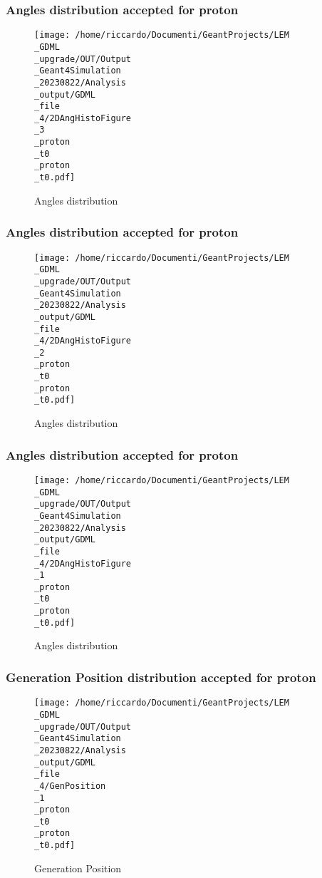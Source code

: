 \documentclass[8pt]{beamer}
\begin{document}
            \begin{frame}
                \frametitle{Angles distribution accepted for proton}
            
        \begin{figure}[h]
            \centering
            \texttt{[image: /home/riccardo/Documenti/GeantProjects/LEM\\\_GDML\\\_upgrade/OUT/Output\\\_Geant4Simulation\\\_20230822/Analysis\\\_output/GDML\\\_file\\\_4/2DAngHistoFigure\\\_3\\\_proton\\\_t0\\\_proton\\\_t0.pdf]}
            \caption{Angles distribution}
        \end{figure}
        
            \end{frame}
            
            \begin{frame}
                \frametitle{Angles distribution accepted for proton}
            
        \begin{figure}[h]
            \centering
            \texttt{[image: /home/riccardo/Documenti/GeantProjects/LEM\\\_GDML\\\_upgrade/OUT/Output\\\_Geant4Simulation\\\_20230822/Analysis\\\_output/GDML\\\_file\\\_4/2DAngHistoFigure\\\_2\\\_proton\\\_t0\\\_proton\\\_t0.pdf]}
            \caption{Angles distribution}
        \end{figure}
        
            \end{frame}
            
            \begin{frame}
                \frametitle{Angles distribution accepted for proton}
            
        \begin{figure}[h]
            \centering
            \texttt{[image: /home/riccardo/Documenti/GeantProjects/LEM\\\_GDML\\\_upgrade/OUT/Output\\\_Geant4Simulation\\\_20230822/Analysis\\\_output/GDML\\\_file\\\_4/2DAngHistoFigure\\\_1\\\_proton\\\_t0\\\_proton\\\_t0.pdf]}
            \caption{Angles distribution}
        \end{figure}
        
            \end{frame}
            
            \begin{frame}
                \frametitle{Generation Position distribution accepted for proton}
            
        \begin{figure}[h]
            \centering
            \texttt{[image: /home/riccardo/Documenti/GeantProjects/LEM\\\_GDML\\\_upgrade/OUT/Output\\\_Geant4Simulation\\\_20230822/Analysis\\\_output/GDML\\\_file\\\_4/GenPosition\\\_1\\\_proton\\\_t0\\\_proton\\\_t0.pdf]}
            \caption{Generation Position}
        \end{figure}
        
            \end{frame}
            
\end{document}

